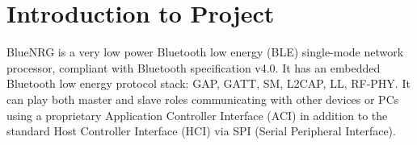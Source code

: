 \chapter{Introduction to Project}
BlueNRG is a very low power Bluetooth low energy (BLE) single-mode network processor, compliant with Bluetooth specification v4.0. It has an embedded Bluetooth low energy protocol stack: GAP, GATT, SM, L2CAP, LL, RF-PHY. It can play both master and slave roles communicating with other devices or PCs using a proprietary Application Controller Interface (ACI) in addition to the standard Host Controller Interface (HCI) via SPI (Serial Peripheral Interface). 





